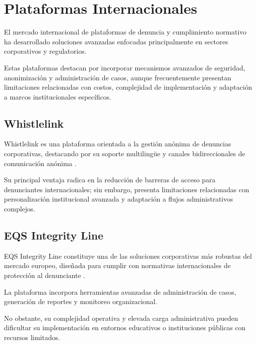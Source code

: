 
\section{Plataformas Internacionales}

\begin{flushleft}
\justifying

El mercado internacional de plataformas de denuncia y cumplimiento normativo ha desarrollado soluciones avanzadas enfocadas principalmente en sectores corporativos y regulatorios.

Estas plataformas destacan por incorporar mecanismos avanzados de seguridad, anonimización y administración de casos, aunque frecuentemente presentan limitaciones relacionadas con costos, complejidad de implementación y adaptación a marcos institucionales específicos.

\end{flushleft}

\subsection{Whistlelink}

\begin{flushleft}
\justifying

Whistlelink es una plataforma orientada a la gestión anónima de denuncias corporativas, destacando por su soporte multilingüe y canales bidireccionales de comunicación anónima \cite{15}.

Su principal ventaja radica en la reducción de barreras de acceso para denunciantes internacionales; sin embargo, presenta limitaciones relacionadas con personalización institucional avanzada y adaptación a flujos administrativos complejos.

\end{flushleft}

\subsection{EQS Integrity Line}

\begin{flushleft}
\justifying

EQS Integrity Line constituye una de las soluciones corporativas más robustas del mercado europeo, diseñada para cumplir con normativas internacionales de protección al denunciante \cite{16}.

La plataforma incorpora herramientas avanzadas de administración de casos, generación de reportes y monitoreo organizacional.

No obstante, su complejidad operativa y elevada carga administrativa pueden dificultar su implementación en entornos educativos o instituciones públicas con recursos limitados.

\end{flushleft}

